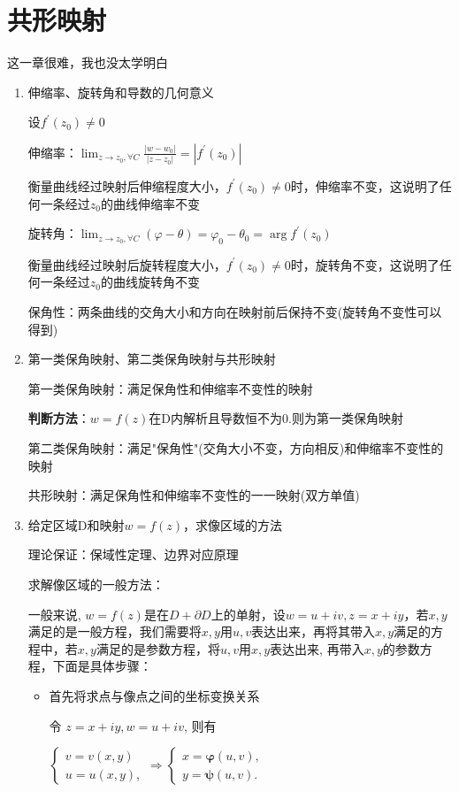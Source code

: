 \documentclass[a4paper,11pt,UTF8]{article}
\begin{document}
\section{共形映射}
这一章很难，我也没太学明白
\begin{enumerate}
	\item 伸缩率、旋转角和导数的几何意义
	
	设$f^\prime(z_0)\neq0$
	
	伸缩率：$\displaystyle\lim_{z\to z_0,\forall C}\frac{|w-w_0|}{|z-z_0|}=|f^\prime(z_0)|$
	
	衡量曲线经过映射后伸缩程度大小，$f^\prime(z_0)\neq0$时，伸缩率不变，这说明了任何一条经过$z_0$的曲线伸缩率不变
	
	旋转角：$\displaystyle\lim_{z\to z_0,\forall C}(\varphi - \theta)=\varphi_0-\theta_0=\arg f^\prime(z_0)$
	
	衡量曲线经过映射后旋转程度大小，$f^\prime(z_0)\neq0$时，旋转角不变，这说明了任何一条经过$z_0$的曲线旋转角不变
	
	保角性：两条曲线的交角大小和方向在映射前后保持不变(旋转角不变性可以得到)
	\item 第一类保角映射、第二类保角映射与共形映射
	
	第一类保角映射：满足保角性和伸缩率不变性的映射
	
	\textbf{判断方法}：$w=f(z)$在D内解析且导数恒不为0.则为第一类保角映射
	
	第二类保角映射：满足"保角性"(交角大小不变，方向相反)和伸缩率不变性的映射
	
	共形映射：满足保角性和伸缩率不变性的一一映射(双方单值)
	\item 给定区域D和映射$w=f(z)$，求像区域的方法
	
	理论保证：保域性定理、边界对应原理
	
	求解像区域的一般方法：
	
	一般来说, $w=f(z)$是在$D+\partial D$上的单射，设$w=u+iv,z=x+iy$，若$x,y$满足的是一般方程，我们需要将$x,y$用$u,v$表达出来，再将其带入$x,y$满足的方程中，若$x,y$满足的是参数方程，将$u,v$用$x,y$表达出来, 再带入$x,y$的参数方程，下面是具体步骤：
	\begin{itemize}	
		\item 首先将求点与像点之间的坐标变换关系

		令 $z=x+iy,w=u+iv$, 则有
		
		$\begin{cases}v=v(x,y)\\u=u(x,y),\end{cases}\Rightarrow\begin{cases}x=\boldsymbol{\varphi}(u,v),\\y=\boldsymbol{\psi}(u,v).&\end{cases}$ 
		

\end{itemize}
\end{enumerate}
\end{document}
